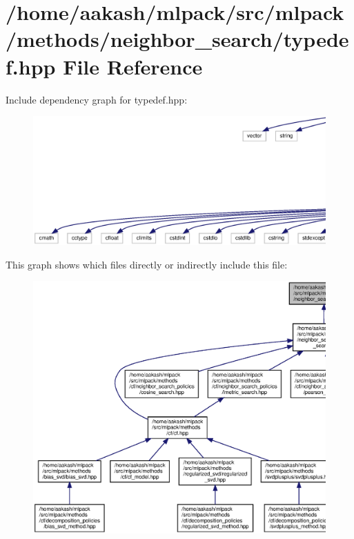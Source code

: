 \section{/home/aakash/mlpack/src/mlpack/methods/neighbor\+\_\+search/typedef.hpp File Reference}
\label{methods_2neighbor__search_2typedef_8hpp}
Include dependency graph for typedef.\+hpp\+:
\nopagebreak
\begin{figure}[H]
\begin{center}
\leavevmode
\includegraphics[width=350pt]{methods_2neighbor__search_2typedef_8hpp__incl}
\end{center}
\end{figure}
This graph shows which files directly or indirectly include this file\+:
\nopagebreak
\begin{figure}[H]
\begin{center}
\leavevmode
\includegraphics[width=350pt]{methods_2neighbor__search_2typedef_8hpp__dep__incl}
\end{center}
\end{figure}
